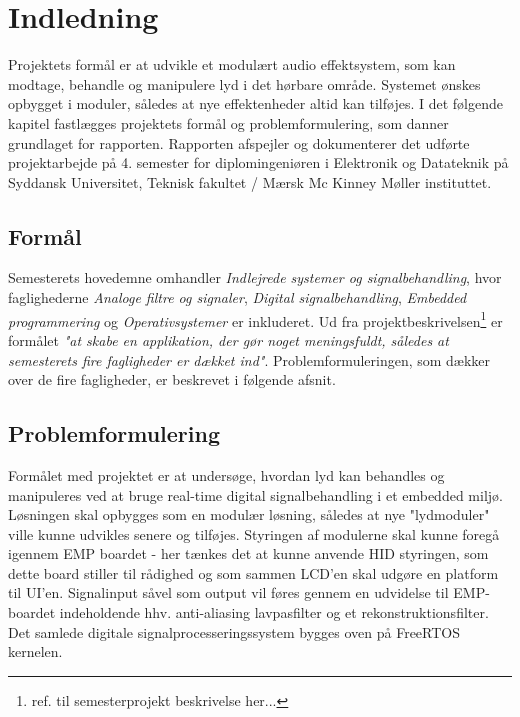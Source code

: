 \chapter{Indledning}
\vspace*{0.5 cm}
Projektets formål er at udvikle et modulært audio effektsystem, som kan modtage, behandle og manipulere lyd i det hørbare område. 
Systemet ønskes opbygget i moduler, således at nye effektenheder altid kan tilføjes. \newline
I det følgende kapitel fastlægges projektets formål og problemformulering, som danner grundlaget for rapporten.
Rapporten afspejler og dokumenterer det udførte projektarbejde på 4. semester for diplomingeniøren i Elektronik og Datateknik på Syddansk Universitet, Teknisk fakultet / Mærsk Mc Kinney Møller instituttet.

\section{Formål}
Semesterets hovedemne omhandler \emph{Indlejrede systemer og signalbehandling}, hvor faglighederne \emph{Analoge filtre og signaler}, \emph{Digital signalbehandling}, \emph{Embedded programmering} og \emph{Operativsystemer} er inkluderet.
Ud fra projektbeskrivelsen\footnote{ref. til  semesterprojekt beskrivelse her...} er formålet\textit{ "at skabe en applikation, der gør noget meningsfuldt, således at semesterets fire fagligheder er dækket ind"}. \newline
Problemformuleringen, som dækker over de fire fagligheder, er beskrevet i følgende afsnit. 


\section{Problemformulering}
Formålet med projektet er at undersøge, hvordan lyd kan behandles og manipuleres ved at bruge real-time digital signalbehandling i et embedded miljø.
Løsningen skal opbygges som en modulær løsning, således at nye "lydmoduler" ville kunne udvikles senere og tilføjes.  
Styringen af modulerne skal kunne foregå igennem EMP boardet - her tænkes det at kunne anvende HID styringen, som dette board stiller til rådighed og som sammen LCD'en skal udgøre en platform til UI'en. 
Signalinput såvel som output vil føres gennem en udvidelse til EMP-boardet indeholdende hhv. anti-aliasing lavpasfilter og et rekonstruktionsfilter.
Det samlede digitale signalprocesseringssystem bygges oven på FreeRTOS kernelen.

